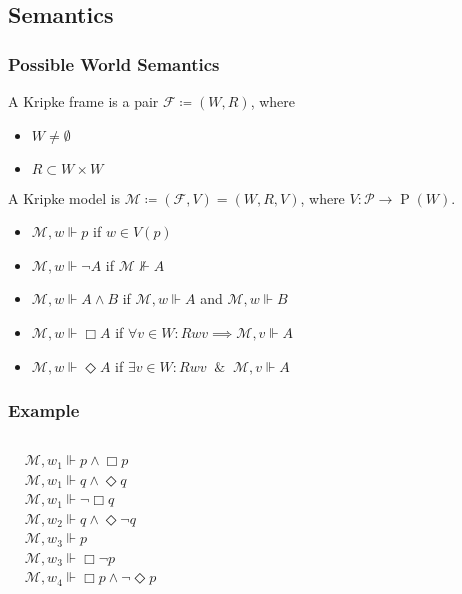 \documentclass[UTF8,aspectratio=43,11pt,colorlinks,compress,openany]{beamer}%
\begin{document}
\subsection{Semantics}

\begin{frame}\frametitle{Possible World Semantics}
	A Kripke frame is a pair $\mathcal{F}\coloneqq (W,R)$, where
	\begin{itemize}
		\item $W\neq\emptyset$
		\item $R\subset W\times W$
	\end{itemize}
	A Kripke model is $\mathcal{M}\coloneqq (\mathcal{F},V)=(W,R,V)$, where $V:\mathcal{P}\to \operatorname{P}(W)$.
	\begin{itemize}
		\item $\mathcal{M},w\Vdash p$ if $w\in V(p)$
		\item $\mathcal{M},w\Vdash\neg A$ if $\mathcal{M}\nVdash A$
		\item $\mathcal{M},w\Vdash A\wedge B$ if $\mathcal{M},w\Vdash A$ and $\mathcal{M},w\Vdash B$
		\item $\mathcal{M},w\Vdash\Box A$ if $\forall v\in W: Rwv\implies\mathcal{M},v\Vdash A$
		\item $\mathcal{M},w\Vdash\Diamond A$ if $\exists v\in W: Rwv\;\;\&\;\;\mathcal{M},v\Vdash A$
	\end{itemize}
\end{frame}

\begin{frame}\frametitle{Example}
	\begin{columns}
			\centering{}
			\begin{align*}
			&\mathcal{M},w_1\Vdash p\wedge\Box p\\
			&\mathcal{M},w_1\Vdash q\wedge\Diamond q\\
			&\mathcal{M},w_1\Vdash\neg\Box q\\
			&\mathcal{M},w_2\Vdash q\wedge\Diamond\neg q\\
			&\mathcal{M},w_3\Vdash p\\
			&\mathcal{M},w_3\Vdash\Box\neg p\\
			&\mathcal{M},w_4\Vdash\Box p\wedge\neg\Diamond p
			\end{align*}
	\end{columns}
\end{frame}
\end{document}
